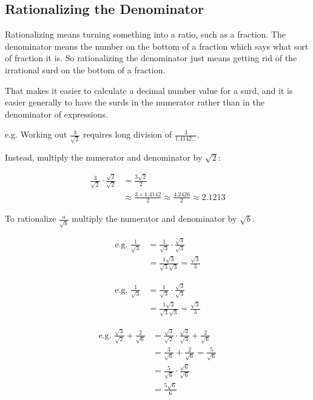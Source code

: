 \documentclass{article}
\begin{document}
\newpage

\subsection{Rationalizing the Denominator}
Rationalizing means turning something into a ratio, such as a fraction. The denominator means the number on the bottom of a fraction which says what sort of fraction it is. So rationalizing the denominator just means getting rid of the irrational surd on the bottom of a fraction.

That makes it easier to calculate a decimal number value for a surd, and it is easier generally to have the surds in the numerator rather than in the denominator of expressions.

e.g. Working out $\frac{3}{\sqrt{2}}$ requires long division of $\frac{3}{1.4142\ldots}$.

Instead, multiply the numerator and denominator by $\sqrt{2}$:

\begin{align*}
\frac{3}{\sqrt{2}}\cdot
\frac{\sqrt{2}}{\sqrt{2}}
&=\frac{3\sqrt{2}}{2}\\
&\approx\frac{3 \times 1.4142}{2}
\approx\frac{4.2426}{2}
\approx2.1213
\end{align*}

To rationalize $\frac{a}{\sqrt{b}}$ multiply the numerator and denominator by $\sqrt{b}$.

\begin{align*}
\text{e.g. }
\frac{1}{\sqrt{3}}
&=\frac{1}{\sqrt{3}}\cdot \frac{\sqrt{3}}{\sqrt{3}}\\
&=\frac{1\sqrt{3}}{\sqrt{3}\sqrt{3}}=\frac{\sqrt{3}}{3}
\end{align*}

\begin{align*}
\text{e.g. }
\frac{1}{\sqrt{3}}
&=\frac{1}{\sqrt{3}}\cdot\frac{\sqrt{3}}{\sqrt{3}}\\
&=\frac{1\sqrt{3}}{\sqrt{3}\sqrt{3}}=\frac{\sqrt{3}}{3}
\end{align*}

\begin{align*}
\text{e.g. }
\frac{\sqrt{3}}{\sqrt{2}}+\frac{2}{\sqrt{6}}
&=\frac{\sqrt{3}}{\sqrt{2}}\cdot
\frac{\sqrt{3}}{\sqrt{3}}
+\frac{2}{\sqrt{6}}\\
&=\frac{3}{\sqrt{6}}+\frac{2}{\sqrt{6}}
=\frac{5}{\sqrt{6}}\\
&=\frac{5}{\sqrt{6}}\cdot\frac{\sqrt{6}}{\sqrt{6}}\\
&=\frac{5\sqrt{6}}{6}
\end{align*}
\end{document}
